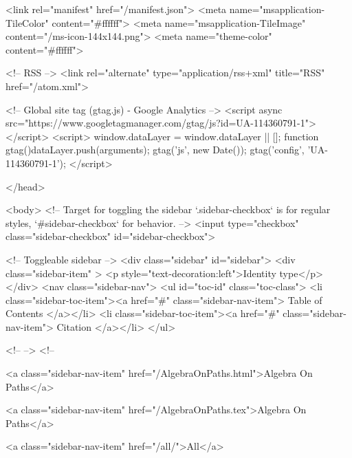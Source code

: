   <link rel="manifest" href="/manifest.json">
  <meta name="msapplication-TileColor" content="#ffffff">
  <meta name="msapplication-TileImage" content="/ms-icon-144x144.png">
  <meta name="theme-color" content="#ffffff">
  
  <!-- RSS -->
  <link rel="alternate" type="application/rss+xml" title="RSS" href="/atom.xml">

  <!-- Global site tag (gtag.js) - Google Analytics -->
  <script async src="https://www.googletagmanager.com/gtag/js?id=UA-114360791-1"></script>
  <script>
    window.dataLayer = window.dataLayer || [];
    function gtag(){dataLayer.push(arguments);}
    gtag('js', new Date());
    gtag('config', 'UA-114360791-1');
  </script>

  
</head>




  <body>
    <!-- Target for toggling the sidebar `.sidebar-checkbox` is for regular
     styles, `#sidebar-checkbox` for behavior. -->
<input type="checkbox" class="sidebar-checkbox" id="sidebar-checkbox">

<!-- Toggleable sidebar -->
<div class="sidebar" id="sidebar">
  <div class="sidebar-item" >
    <p style="text-decoration:left">Identity type</p>
  </div>
  <nav class="sidebar-nav">
    <ul id="toc-id" class="toc-class">
  <li class="sidebar-toc-item"><a href="#" class="sidebar-nav-item"> Table of Contents </a></li>
  <li class="sidebar-toc-item"><a href="#" class="sidebar-nav-item"> Citation </a></li>
</ul>


    <!--  -->
    <!-- 
      
    
      
    
      
    
      
        
      
    
      
        
          <a class="sidebar-nav-item" href="/AlgebraOnPaths.html">Algebra On Paths</a>
        
      
    
      
        
          <a class="sidebar-nav-item" href="/AlgebraOnPaths.tex">Algebra On Paths</a>
        
      
    
      
        
          <a class="sidebar-nav-item" href="/all/">All</a>
        
      
    
      
        
